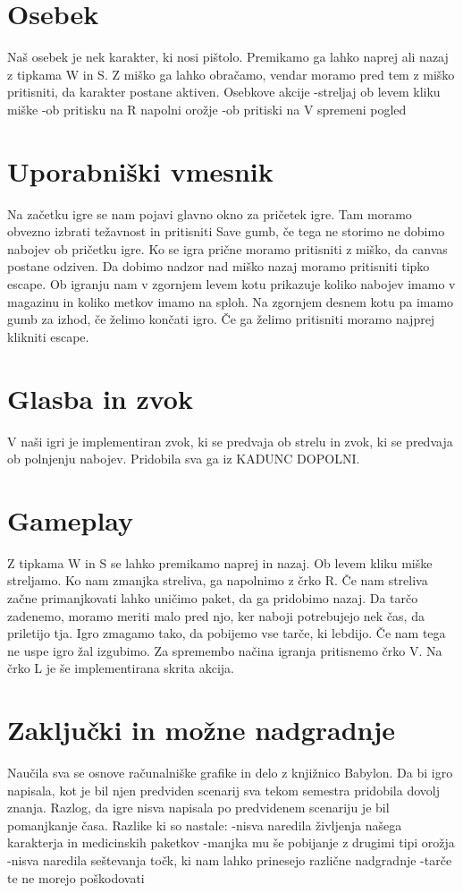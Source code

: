 \documentclass[a4paper]{article}
\begin{document}
\section{Osebek}
Naš osebek je nek karakter, ki nosi pištolo. Premikamo ga lahko naprej ali nazaj z tipkama W in S. Z miško ga lahko obračamo, vendar moramo pred tem z miško pritisniti, da karakter postane aktiven.
Osebkove akcije
-streljaj ob levem kliku miške
-ob pritisku na R napolni orožje
-ob pritiski na V spremeni pogled


\section{Uporabniški vmesnik}
Na začetku igre se nam pojavi glavno okno za pričetek igre. Tam moramo obvezno izbrati težavnost in pritisniti Save gumb, če tega ne storimo ne dobimo nabojev ob pričetku igre.
Ko se igra prične moramo pritisniti z miško, da canvas postane odziven. Da dobimo nadzor nad miško nazaj moramo pritisniti tipko escape. 
Ob igranju nam v zgornjem levem kotu prikazuje koliko nabojev imamo v magazinu in koliko metkov imamo na sploh. Na zgornjem desnem kotu pa imamo gumb za izhod, če želimo končati igro.
Če ga želimo pritisniti moramo najprej klikniti escape.


\section{Glasba in zvok}
V naši igri je implementiran zvok, ki se predvaja ob strelu in zvok, ki se predvaja ob polnjenju nabojev. Pridobila sva ga iz KADUNC DOPOLNI. 

\section{Gameplay}
Z tipkama W in S se lahko premikamo naprej in nazaj. Ob levem kliku miške streljamo. Ko nam zmanjka streliva, ga napolnimo z črko R.
Če nam streliva začne primanjkovati lahko uničimo paket, da ga pridobimo nazaj. Da tarčo zadenemo, moramo meriti malo pred njo, ker naboji potrebujejo nek čas,
da priletijo tja. Igro zmagamo tako, da pobijemo vse tarče, ki lebdijo. Če nam tega ne uspe igro žal izgubimo.
Za spremembo načina igranja pritisnemo črko V. Na črko L je še implementirana skrita akcija.



\section{Zaključki in možne nadgradnje}
Naučila sva se osnove računalniške grafike in delo z knjižnico Babylon. Da bi igro napisala, kot je bil njen predviden scenarij sva tekom semestra pridobila dovolj znanja.
Razlog, da igre nisva napisala po predvidenem scenariju je bil pomanjkanje časa.
Razlike ki so nastale:
-nisva naredila življenja našega karakterja in medicinskih paketkov
-manjka mu še pobijanje z drugimi tipi orožja
-nisva naredila seštevanja točk, ki nam lahko prinesejo različne nadgradnje
-tarče te ne morejo poškodovati



\small


\end{document}
